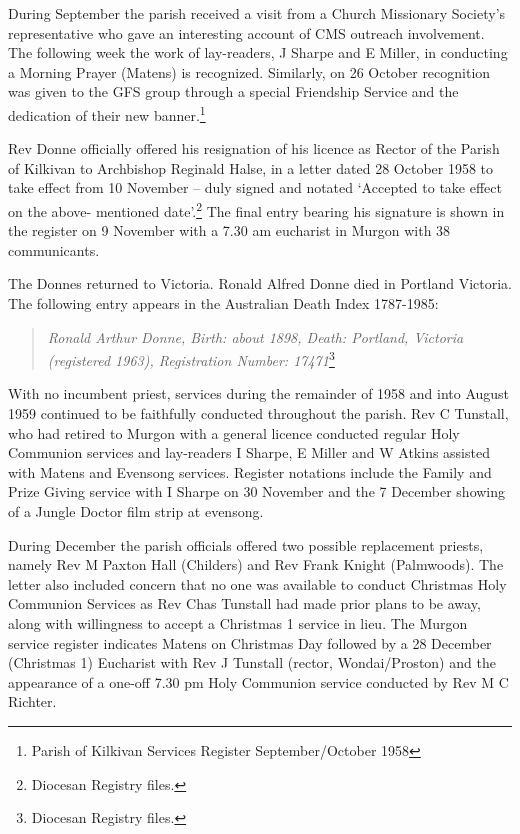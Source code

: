During September the parish received a visit from a Church Missionary Society's representative who gave an interesting account of CMS outreach involvement. The following week the work of lay-readers, J Sharpe and E Miller, in conducting a Morning Prayer (Matens) is recognized. Similarly, on 26 October recognition was given to the GFS group through a special Friendship Service and the dedication of their new banner.\footnote{Parish of Kilkivan Services Register September/October 1958}

Rev Donne officially offered his resignation of his licence as Rector of the Parish of Kilkivan to Archbishop Reginald Halse, in a letter dated 28 October 1958 to take effect from 10 November -- duly signed and notated `Accepted to take effect on the above- mentioned date'.\footnote{Diocesan Registry files.} The final entry bearing his signature is shown in the register on 9 November with a 7.30 am eucharist in Murgon with 38 communicants.

The Donnes returned to Victoria. Ronald Alfred Donne died in Portland Victoria. The following entry appears in the Australian Death Index 1787-1985:

\begin{quote}
\emph{Ronald Arthur Donne, Birth: about 1898, Death: Portland, Victoria (registered 1963), Registration Number: 17471}\footnote{Diocesan Registry files.}
\end{quote}

With no incumbent priest, services during the remainder of 1958 and into August 1959 continued to be faithfully conducted throughout the parish. Rev C Tunstall, who had retired to Murgon with a general licence conducted regular Holy Communion services and lay-readers I Sharpe, E Miller and W Atkins assisted with Matens and Evensong services. Register notations include the Family and Prize Giving service with I Sharpe on 30 November and the 7 December showing of a Jungle Doctor film strip at evensong.

During December the parish officials offered two possible replacement priests, namely Rev M Paxton Hall (Childers) and Rev Frank Knight (Palmwoods). The letter also included concern that no one was available to conduct Christmas Holy Communion Services as Rev Chas Tunstall had made prior plans to be away, along with willingness to accept a Christmas 1 service in lieu. The Murgon service register indicates Matens on Christmas Day followed by a 28 December (Christmas 1) Eucharist with Rev J Tunstall (rector, Wondai/Proston) and the appearance of a one-off 7.30 pm Holy Communion service conducted by Rev M C Richter.

